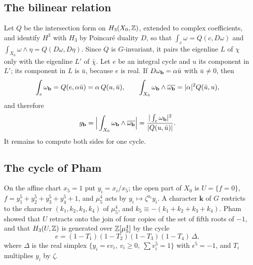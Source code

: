 \subsection{The bilinear relation}

Let $Q$ be the intersection form on $H_3(X_0,\mathbb{Z})$, extended to complex
coefficients, and identify $H^3$ with $H_3$ by Poincar\'e duality $D$, so
that $\int_c\omega=Q(c,D\omega)$ and $\int_{X_0}\omega\wedge\eta=
Q(D\omega,D\eta)$. Since $Q$ is $G$-invariant, it pairs the eigenline $L$ of
$\chi$ only with the eigenline $L'$ of $\bar\chi$. Let $e$ be an integral
cycle and $u$ its component in $L'$; its component in $L$ is $\bar u$,
because $e$ is real. If $D\omega_{\mathbf{b}}=\alpha\bar u$ with $\bar u\ne0$, then
\[
\int_e\omega_{\mathbf{b}}=Q(e,\alpha\bar u)=\alpha\,Q(u,\bar u),\qquad
\int_{X_0}\omega_{\mathbf{b}}\wedge\overline{\omega_{\mathbf{b}}}=|\alpha|^2Q(\bar u,u),
\]
and therefore
\begin{equation}\label{eq:bilinear}
g_{\mathbf{b}}=\Big|\int_{X_0}\omega_{\mathbf{b}}\wedge\overline{\omega_{\mathbf{b}}}\Big|
=\frac{|\int_e\omega_{\mathbf{b}}|^2}{|Q(u,\bar u)|}.
\end{equation}
It remains to compute both sides for one cycle.

\subsection{The cycle of Pham}

On the affine chart $x_5=1$ put $y_i=x_i/x_5$; the open part of $X_0$ is
$U=\{f=0\}$, $f=y_1^5+y_2^5+y_3^5+y_4^5+1$, and $\mu_5^4$ acts by
$y_i\mapsto\zeta^{a_i}y_i$. A character $\mathbf k$ of $G$ restricts to the
character $(k_1,k_2,k_3,k_4)$ of $\mu_5^4$, and $k_5\equiv-(k_1+k_2+k_3+
k_4)$. Pham~\cite{Pha65} showed that $U$ retracts onto the join of four
copies of the set of fifth roots of $-1$, and that $H_3(U,\mathbb{Z})$ is generated
over $\mathbb{Z}[\mu_5^4]$ by the cycle
\[
e=(1-T_1)(1-T_2)(1-T_3)(1-T_4)\,\Delta,
\]
where $\Delta$ is the real simplex $\{y_i=\epsilon v_i,\ v_i\ge0,\
\sum v_i^5=1\}$ with $\epsilon^5=-1$, and $T_i$ multiplies $y_i$ by
$\zeta$.

